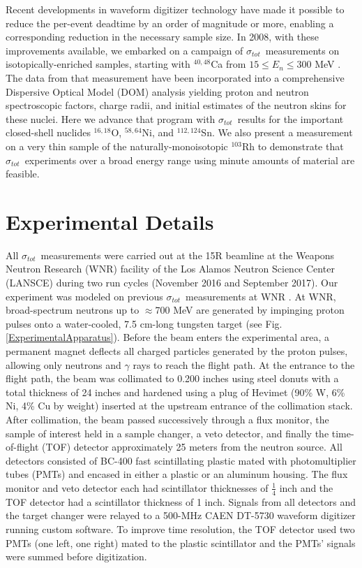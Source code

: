 \documentclass[twocolumn,secnumarabic,amssymb, nobibnotes, aps, prl,
superscriptaddress, nobalancelastpage]{revtex4}
\newcommand{\tot}{\ensuremath{\sigma_{tot}}}
\begin{document}
Recent developments in waveform digitizer technology have made it
possible to reduce the per-event deadtime by an order of magnitude or more,
enabling a corresponding reduction in the necessary sample size. In 2008, with
these improvements available, we
embarked on a campaign of \tot\ measurements on isotopically-enriched samples,
starting with $^{40,48}$Ca from $15 \leq E_{n} \leq 300$ MeV \cite{Shane2010}.
The data from that measurement have been incorporated into a comprehensive
Dispersive Optical Model (DOM) analysis \cite{Mueller2011, Mahzoon2014,
MahzoonPhDThesis} yielding proton and neutron spectroscopic factors, charge
radii, and initial estimates of the neutron skins \cite{Mahzoon2017}
for these nuclei.
Here we advance that program with \tot\ results for
the important closed-shell nuclides
$^{16,18}$O, $^{58,64}$Ni, and $^{112,124}$Sn. We also present a measurement
on a very thin sample of the naturally-monoisotopic $^{103}$Rh to demonstrate that
\tot\ experiments over a broad energy range using minute amounts of material are feasible.

\section{Experimental Details}
All \tot\ measurements were carried out at the 15R
beamline at the Weapons Neutron Research (WNR) facility of the Los Alamos
Neutron Science Center (LANSCE) during two run cycles (November 2016 and
September 2017). Our experiment was modeled on previous
\tot\ measurements at WNR \cite{Finlay1993,Abfalterer2001,Shane2010}.
At WNR,
broad-spectrum neutrons up
to $\approx$700 MeV are generated by impinging proton pulses onto a water-cooled, 7.5
cm-long tungsten target (see Fig. \ref{ExperimentalApparatus}). Before the beam
enters the experimental area, a
permanent magnet deflects all charged particles generated by the proton pulses, 
allowing only neutrons and $\gamma$ rays to reach the flight path. At the
entrance to the flight path, the beam was collimated to 0.200 inches using steel
donuts with a total thickness of 24 inches and hardened using a plug of Hevimet (90\% W, 6\% 
Ni, 4\% Cu by weight) inserted at the upstream entrance of the
collimation stack. After collimation, the beam passed successively through a flux 
monitor, the sample of interest held in a sample changer, a veto detector, and finally the 
time-of-flight (TOF) detector approximately 25 meters from the neutron source.
All detectors consisted of BC-400 fast scintillating plastic mated with 
photomultiplier tubes (PMTs) and encased in either a plastic or
an aluminum housing. The flux monitor and veto detector each had
scintillator thicknesses of $\frac{1}{4}$ inch and the TOF detector had a
scintillator thickness of 1 inch. Signals from all detectors and
the target changer were relayed to a 500-MHz CAEN DT-5730 waveform digitizer
running custom software. To improve time resolution, the TOF detector used two
PMTs (one left, one right) mated to the plastic scintillator and the PMTs' signals were 
summed before digitization.
\end{document}
